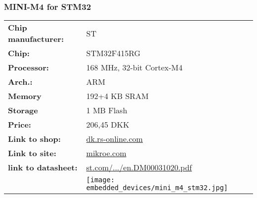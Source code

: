 \subsubsection*{MINI-M4 for STM32}
\begin{tabular}{ l l }

	\textbf{Chip manufacturer:} &
	ST \\

	\textbf{Chip:} &
	STM32F415RG \\

	\textbf{Processor:} &
	168 MHz, 32-bit Cortex-M4 \\

	\textbf{Arch.:} &
	ARM \\

	\textbf{Memory} &
	192+4 KB SRAM \\

	\textbf{Storage} &
	1 MB Flash \\

	\textbf{Price:} &
	206,45 DKK \\

	\textbf{Link to shop:} &
	\href{http://dk.rs-online.com/web/p/processor-og-mikrocontroller-udviklingssaet/8209870/}{dk.rs-online.com} \\

	\textbf{Link to site:} &
	\href{http://www.mikroe.com/mini/stm32/}{mikroe.com} \\

	\textbf{link to datasheet:} &
	\href{http://www.st.com/content/ccc/resource/technical/document/reference_manual/3d/6d/5a/66/b4/99/40/d4/DM00031020.pdf/files/DM00031020.pdf/jcr:content/translations/en.DM00031020.pdf}{st.com/.../en.DM00031020.pdf} \\

	&
	\texttt{[image: embedded\_devices/mini\_m4\_stm32.jpg]} \\

\end{tabular}


